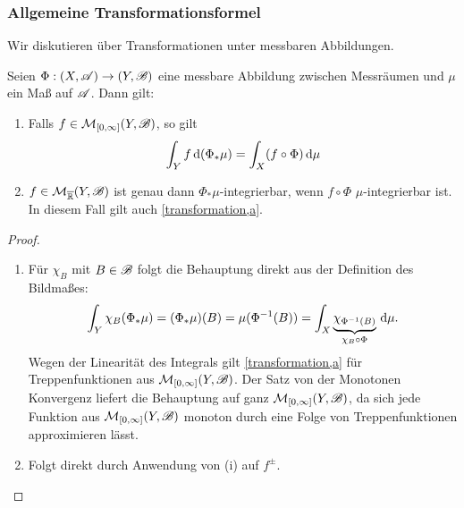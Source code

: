 \subsubsection{Allgemeine Transformationsformel}
Wir diskutieren über Transformationen unter messbaren Abbildungen.
\begin{satz}
\begin{mdframed}
Seien $\Phi:(X,\AA)\to (Y,\BB)$ eine messbare Abbildung zwischen Messräumen und $\mu$ ein Maß auf $\AA$. 
Dann gilt:
\begin{enumerate}
	\item Falls $f \in \MM_{[0,\infty]}(Y,\BB)$, so gilt
	\begin{equation} \label{transformation,a}
		\int_Yf\D (\Phi_*\mu) =\int_X (f\circ \Phi)\D\mu
	\end{equation}
	\item $f\in \MM_{\ol\R}(Y,\BB)$ ist genau dann $\Phi_*\mu$-integrierbar, wenn $f\circ \Phi$ $\mu$-integrierbar ist. In diesem Fall gilt auch \eqref{transformation,a}.
\end{enumerate}
\end{mdframed}
\begin{proof}
\begin{enumerate}
\item Für $\chi_B$ mit $B\in\BB$ folgt die Behauptung direkt aus der Definition des Bildmaßes:
$$
\int_Y \chi_B(\Phi_*\mu)=(\Phi_*\mu)(B)=\mu(\Phi^{-1}(B))=\int_X \underbrace{\chi_{\Phi^{-1}(B)}}_{ \chi_B\circ\Phi}\D\mu.
$$
Wegen der Linearität des Integrals gilt \eqref{transformation,a} für Treppenfunktionen aus $\MM_{[0,\infty]}(Y,\BB)$. Der Satz von der Monotonen Konvergenz liefert die Behauptung auf ganz $\MM_{[0,\infty]}(Y,\BB)$, da sich jede Funktion aus $\MM_{[0,\infty]}(Y,\BB)$ monoton durch eine Folge von Treppenfunktionen approximieren lässt.
\item Folgt direkt durch Anwendung von (i) auf $f^\pm$.
\end{enumerate}
\end{proof}
\end{satz}


